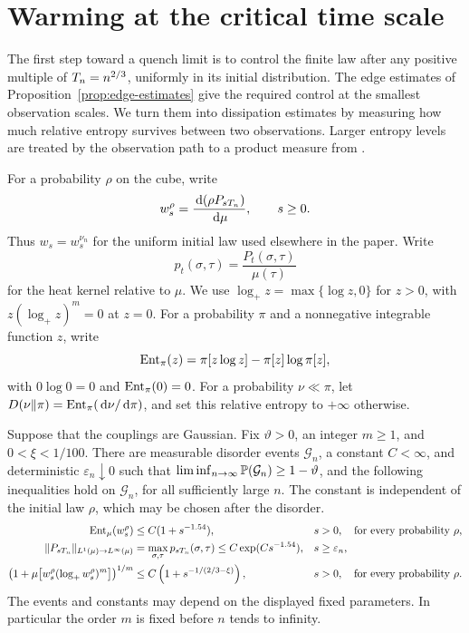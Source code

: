 \section{Warming at the critical time scale}\label{sec:warming}

The first step toward a quench limit is to control the finite law after
any positive multiple of \(T_n=n^{2/3}\), uniformly in its initial
distribution.  The edge estimates of Proposition~\ref{prop:edge-estimates} give the
required control at the smallest observation scales.  We turn them into
dissipation estimates by measuring how much relative entropy survives
between two observations.  Larger entropy levels are treated by the
observation path to a product measure from \cite[Section~19]{CM}.

For a probability \(\rho\) on the cube, write
\[
 w_s^\rho=\frac{\,\mathrm d(\rho P_{sT_n})}{\,\mathrm d\mu},\qquad s\ge0.
\]
Thus \(w_s=w_s^{\nu_n}\) for the uniform initial law used elsewhere in
the paper.  Write
\[
 p_t(\sigma,\tau)=\frac{P_t(\sigma,\tau)}{\mu(\tau)}
\]
for the heat kernel relative to \(\mu\).  We use
\(\log_+z=\max\{\log z,0\}\) for \(z>0\), with
\(z(\log_+z)^m=0\) at \(z=0\).
For a probability \(\pi\) and a nonnegative integrable function \(z\), write
\[
 \operatorname{Ent}_\pi(z)=\pi[z\log z]-\pi[z]\log\pi[z],
\]
with \(0\log0=0\) and \(\operatorname{Ent}_\pi(0)=0\).  For a probability
\(\nu\ll\pi\), let
\(D(\nu\Vert\pi)=\operatorname{Ent}_\pi(\,\mathrm d\nu/\,\mathrm d\pi)\), and set this relative
entropy to \(+\infty\) otherwise.

\begin{theorem}\label{thm:warming}
Suppose that the couplings are Gaussian.  Fix \(\vartheta>0\), an integer
\(m\ge1\), and \(0<\xi<1/100\).  There are measurable disorder events
\(\mathcal G_n\), a constant \(C<\infty\), and deterministic
\(\varepsilon_n\downarrow0\) such that
\(\liminf_{n\to\infty}\mathbb P(\mathcal G_n)\ge1-\vartheta\), and the
following inequalities hold on \(\mathcal G_n\), for all sufficiently
large \(n\).  The constant is independent of the initial law \(\rho\),
which may be chosen after the disorder.
\begin{align}
 \operatorname{Ent}_\mu(w_s^\rho)&\le C(1+s^{-1.54}),
       &&s>0,\quad\hbox{for every probability }\rho ,
       \label{warm:entropy}\\
 \|P_{sT_n}\|_{L^1(\mu)\to L^\infty(\mu)}
       &=\max_{\sigma,\tau}p_{sT_n}(\sigma,\tau)
       \le C\exp(C s^{-1.54}),
       &&s\ge\varepsilon_n ,
       \label{warm:kernel}\\
 \left(1+\mu\!\left[
       w_s^\rho(\log_+w_s^\rho)^m\right]\right)^{1/m}
       &\le C\left(1+s^{-1/(2/3-\xi)}\right),
       &&s>0,\quad\hbox{for every probability }\rho .
       \label{warm:log-moment}
\end{align}
The events and constants may depend on the displayed fixed parameters.
In particular the order \(m\) is fixed before \(n\) tends to infinity.
\end{theorem}


